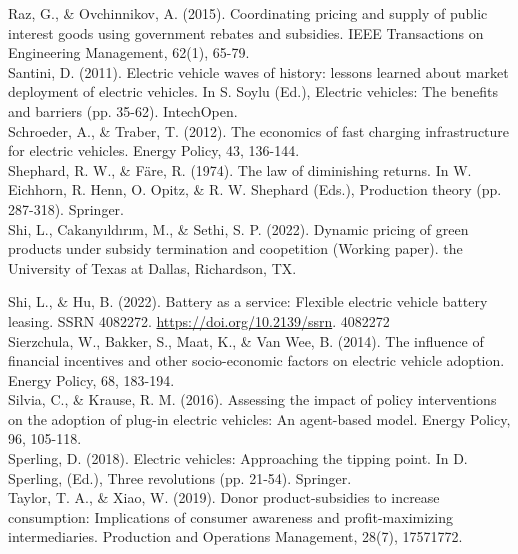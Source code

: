 \documentclass[10pt]{article}
\begin{document}
Raz, G., \& Ovchinnikov, A. (2015). Coordinating pricing and supply of public interest goods using government rebates and subsidies. IEEE Transactions on Engineering Management, 62(1), 65-79.\\
Santini, D. (2011). Electric vehicle waves of history: lessons learned about market deployment of electric vehicles. In S. Soylu (Ed.), Electric vehicles: The benefits and barriers (pp. 35-62). IntechOpen.\\
Schroeder, A., \& Traber, T. (2012). The economics of fast charging infrastructure for electric vehicles. Energy Policy, 43, 136-144.\\
Shephard, R. W., \& Färe, R. (1974). The law of diminishing returns. In W. Eichhorn, R. Henn, O. Opitz, \& R. W. Shephard (Eds.), Production theory (pp. 287-318). Springer.\\
Shi, L., Cakanyıldırım, M., \& Sethi, S. P. (2022). Dynamic pricing of green products under subsidy termination and coopetition (Working paper). the University of Texas at Dallas, Richardson, TX.

Shi, L., \& Hu, B. (2022). Battery as a service: Flexible electric vehicle battery leasing. SSRN 4082272. \href{https://doi.org/10.2139/ssrn}{https://doi.org/10.2139/ssrn}. 4082272\\
Sierzchula, W., Bakker, S., Maat, K., \& Van Wee, B. (2014). The influence of financial incentives and other socio-economic factors on electric vehicle adoption. Energy Policy, 68, 183-194.\\
Silvia, C., \& Krause, R. M. (2016). Assessing the impact of policy interventions on the adoption of plug-in electric vehicles: An agent-based model. Energy Policy, 96, 105-118.\\
Sperling, D. (2018). Electric vehicles: Approaching the tipping point. In D. Sperling, (Ed.), Three revolutions (pp. 21-54). Springer.\\
Taylor, T. A., \& Xiao, W. (2019). Donor product-subsidies to increase consumption: Implications of consumer awareness and profit-maximizing intermediaries. Production and Operations Management, 28(7), 17571772.
\end{document}
